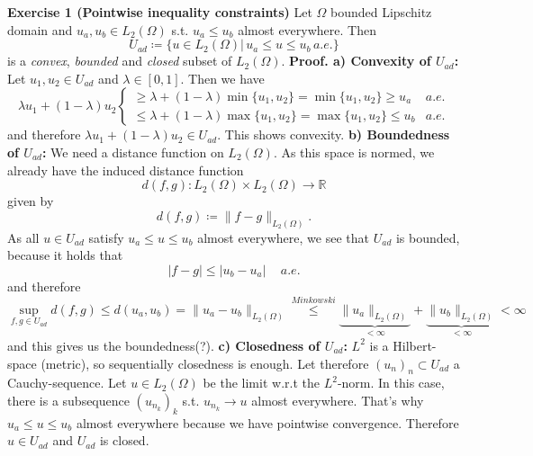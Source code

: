\documentclass{article}
\begin{document}
\textbf{Exercise 1 (Pointwise inequality constraints)}\newline\noindent
Let $\Omega$ bounded Lipschitz domain and $u_a,u_b\in L_2(\Omega)$ s.t. $u_a\leq u_b$ almost everywhere. Then
\[
	U_{ad}\coloneqq\{u\in L_2(\Omega)|\,u_a\leq u\leq u_b\,a.e.\}
\]
is a \emph{convex}, \emph{bounded} and \emph{closed} subset of $L_2(\Omega)$.\newline\newline\noindent
\textbf{Proof. a) Convexity of $U_{ad}$: } Let $u_1,u_2\in U_{ad}$ and $\lambda\in[0,1]$. Then we have
\[
	\lambda u_1+(1-\lambda)u_2 	\begin{cases}
									\geq \lambda+(1-\lambda)\min{\{u_1,u_2\}} = \min{\{u_1,u_2\}} \geq u_a &a.e.\\
									\leq \lambda+(1-\lambda)\max{\{u_1,u_2\}} = \max{\{u_1,u_2\}} \leq u_b &a.e.
								\end{cases}
\]
and therefore $\lambda u_1 + (1-\lambda)u_2\in U_{ad}$. This shows convexity.\newline\newline\noindent
\textbf{b) Boundedness of $U_{ad}$: }
We need a distance function on $L_2(\Omega)$. As this space is normed, we already have the induced distance function
\[
	d(f,g):L_2(\Omega)\times L_2(\Omega)\to\mathbb{R}
\]
given by
\[
	d(f,g) \coloneqq \|f-g\|_{L_2(\Omega)}.
\]
As all $u\in U_{ad}$ satisfy $u_a\leq u\leq u_b$ almost everywhere, we see that $U_{ad}$ is bounded, because it holds that
\[
	|f-g| \leq |u_b-u_a|\quad\,a.e.
\]
and therefore
\[
	\sup_{f,g\in U_{ad}}d(f,g) \leq d(u_a,u_b) = \|u_a-u_b\|_{L_2(\Omega)}\overset{Minkowski}\leq \underbrace{\|u_a\|_{L_2(\Omega)}}_{<\infty}+\underbrace{\|u_b\|_{L_2(\Omega)}}_{<\infty} <\infty
\]
and this gives us the boundedness(?).\newline\newline\noindent
\textbf{c) Closedness of $U_{ad}$: } $L^2$ is a Hilbert-space (metric), so sequentially closedness is enough. Let therefore $(u_n)_n\subset U_{ad}$ a Cauchy-sequence. Let $u\in L_2(\Omega)$ be the limit w.r.t the $L^2$-norm.\newline\noindent
In this case, there is a subsequence $\left(u_{n_k}\right)_k$ s.t. $u_{n_k}\to u$ almost everywhere. That's why $u_a\leq u\leq u_b$ almost everywhere because we have pointwise convergence. Therefore $u\in U_{ad}$ and $U_{ad}$ is closed. \newline\newline\noindent
\end{document}
